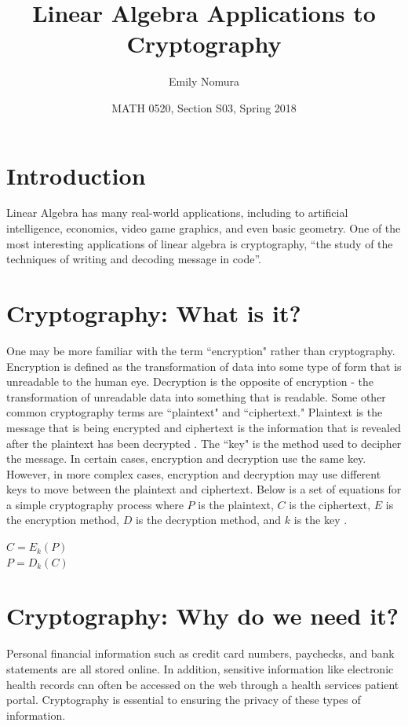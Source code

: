 \documentclass{article}
\title{Linear Algebra Applications to Cryptography}
\author{Emily Nomura}
\date{MATH 0520, Section S03, Spring 2018}
\begin{document}
\maketitle

\section{Introduction}
Linear Algebra has many real-world applications, including to artificial intelligence, economics, video game graphics, and even basic geometry. One of the most interesting applications of linear algebra is cryptography, “the study of the techniques of writing and decoding message in code”\cite{ref1:1}. 

\section{Cryptography: What is it?}
 One may be more familiar with the term ``encryption" rather than cryptography. Encryption is defined as the transformation of data into some type of form that is unreadable to the human eye. Decryption is the opposite of encryption - the transformation of unreadable data into something that is readable. Some other common cryptography terms are ``plaintext" and ``ciphertext." Plaintext is the message that is being encrypted and ciphertext is the information that is revealed after the plaintext has been decrypted \cite{ref1:1}. The ``key" is the method used to decipher the message. In certain cases, encryption and decryption use the same key. However, in more complex cases, encryption and decryption may use different keys to move between the plaintext and ciphertext. Below is a set of equations for a simple cryptography process where $P$ is the plaintext, $C$ is the ciphertext, $E$ is the encryption method, $D$ is the decryption method, and $k$ is the key \cite{ref2:2}.

{\center $C = E_{k}(P)$\\
$P = D_{k}(C)$
\endcenter}

\section{Cryptography: Why do we need it?}
Personal financial information such as credit card numbers, paychecks, and bank statements are all stored online. In addition, sensitive information like electronic health records can often be accessed on the web through a health services patient portal. Cryptography is essential to ensuring the privacy of these types of information.\\
\end{document}
